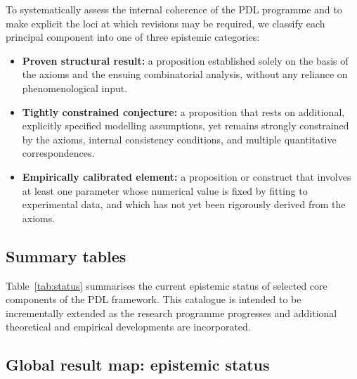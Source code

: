 \documentclass[11pt,a4paper]{article}
\begin{document}
To systematically assess the internal coherence of the PDL programme and to make explicit the loci at which revisions may be required, we classify each principal component into one of three epistemic categories:
\begin{itemize}[leftmargin=1.5em]
  \item \textbf{Proven structural result:} a proposition established solely on the basis of the axioms and the ensuing combinatorial analysis, without any reliance on phenomenological input.
  \item \textbf{Tightly constrained conjecture:} a proposition that rests on additional, explicitly specified modelling assumptions, yet remains strongly constrained by the axioms, internal consistency conditions, and multiple quantitative correspondences.
  \item \textbf{Empirically calibrated element:} a proposition or construct that involves at least one parameter whose numerical value is fixed by fitting to experimental data, and which has not yet been rigorously derived from the axioms.
\end{itemize}

\subsection{Summary tables}
\label{subsec:summary_tables}

Table~\ref{tab:status} summarises the current epistemic status of selected core components of the PDL framework. This catalogue is intended to be incrementally extended as the research programme progresses and additional theoretical and empirical developments are incorporated.

\setlength{\LTpre}{18pt}
\setlength{\LTpost}{0pt}

\subsection{Global result map: epistemic status}
\label{subsec:global_status}
\end{document}
